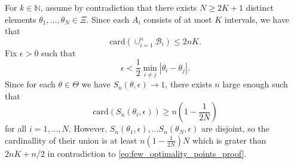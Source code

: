 \documentclass[letterpaper, 11pt]{IEEEtran}      %
\newcommand{\card}{\mathrm{card}}
\begin{document}
For $k\in \mathbb N$, assume by contradiction that there exists $N \geq 2K + 1$ distinct elements
$\theta_1,\ldots,\theta_N \in \Xi$. Since each $A_i$ consists of at most $K$ intervals, we have that 
\begin{equation}
\label{eq:few_optimality_points_proof}
\card (\cup_{i=1}^n \mathcal B_i) \leq 2 n K. 
\end{equation}
Fix $\epsilon>0$ such that 
\[
\epsilon < \frac{1}{2}\min_{i\neq j} |\theta_i - \theta_j|. 
\]
Since for each $\theta \in \Theta$ we have $S_n(\theta, \epsilon) \to 1$, there exists $n$ large enough such that 
\[
\card \left(S_n(\theta_i, \epsilon) \right) \geq n \left(1-\frac{1}{2N} \right)
\]
for all $i=1,\ldots,N$. However, $S_n(\theta_1,\epsilon), \ldots S_n(\theta_N,\epsilon)$ are disjoint, so the cardinallity of their union is at least $n\left(1-\frac{1}{2N} \right)N$ which is grater than $2nK + n/2$ in contradiction to \eqref{eq:few_optimality_points_proof}. 




\end{document}
